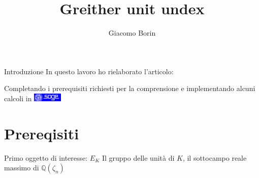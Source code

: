 \documentclass{beamer}
\title{Greither unit undex}
\author{Giacomo Borin}
\institute{Università di Trento}
\newcommand{\Q}{\mathbb{Q}}
\begin{document}
	\begin{frame}[plain]
	    \maketitle
	\end{frame}
	
	\begin{frame}{Introduzione}
		In questo lavoro ho rielaborato l'articolo: 
		\pause
		\begin{exampleblock}{}
		\end{exampleblock}	
		\pause
		Completando i prerequisiti richiesti per la comprensione e implementando alcuni calcoli in \href{https://www.sagemath.org}{\includegraphics[height= 11pt]{../images/sage.png} }
		
	\end{frame}
	\section{Prereqisiti}

	\begin{frame}
		\begin{block}{Primo oggetto di interesse: $ E_K $}
			Il gruppo delle unità di $ K $, il sottocampo reale massimo di $ \Q (\zeta_n )  $
		\end{block}
	\end{frame}
\end{document}
